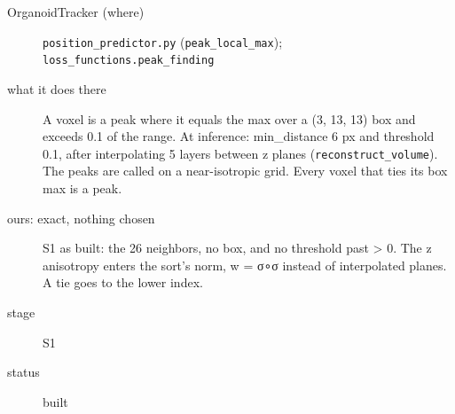 \begin{description}
\item[{OrganoidTracker (where)}] \texttt{position\_\allowbreak{}predictor.\allowbreak{}py} (\texttt{peak\_\allowbreak{}local\_\allowbreak{}max}); \texttt{loss\_\allowbreak{}functions.\allowbreak{}peak\_\allowbreak{}finding}
\item[{what it does there}] A voxel is a peak where it equals the max over a (3, 13, 13) box and exceeds 0.1 of the range. At inference: min\_\allowbreak{}distance 6 px and threshold 0.1, after interpolating 5 layers between z planes (\texttt{reconstruct\_\allowbreak{}volume}). The peaks are called on a near-isotropic grid. Every voxel that ties its box max is a peak.
\item[{ours: exact, nothing chosen}] S1 as built: the 26 neighbors, no box, and no threshold past > 0. The z anisotropy enters the sort's norm, w = σ∘σ instead of interpolated planes. A tie goes to the lower index.
\item[{stage}] S1
\item[{status}] built
\end{description}

